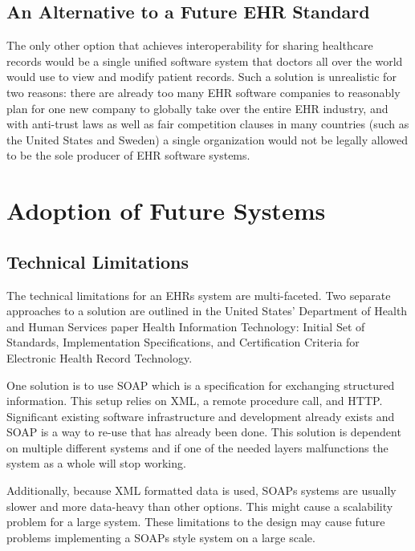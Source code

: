 \documentclass[14pt]{article}
\begin{document}
\subsection{An Alternative to a Future EHR Standard}
The only other option that achieves interoperability for sharing healthcare records would be a single unified software system that doctors all over the world would use to view and modify patient records. Such a solution is unrealistic for two reasons: there are already too many \gls{EHR} software companies to reasonably plan for one new company to globally take over the entire \gls{EHR} industry, and with anti-trust laws as well as fair competition clauses in many countries (such as the United States and Sweden) a single organization would not be legally allowed to be the sole producer of \gls{EHR} software systems.

\newpage

\section{Adoption of Future Systems}
\label{sec:Future}

\subsection{Technical Limitations}

The technical limitations for an \glspl{EHR} system are multi-faceted. Two separate approaches to a solution are outlined in the United States’ Department of Health and Human Services paper Health Information Technology: Initial Set of Standards, Implementation Specifications, and Certification Criteria for Electronic Health Record Technology. \cite{AMA} 

One solution is to use \gls{SOAP} which is a specification for exchanging structured information. This setup relies on \gls{XML}, a remote procedure call, and \gls{HTTP}. Significant existing software infrastructure and development already exists and SOAP is a way to re-use that has already been done. This solution is dependent on multiple different systems and if one of the needed layers malfunctions the system as a whole will stop working. 

Additionally, because \gls{XML} formatted data is used, \glspl{SOAP} systems are usually slower and more data-heavy than other options. This might cause a scalability problem for a large system. These limitations to the design may cause future problems implementing a \glspl{SOAP} style system on a large scale.
\end{document}
